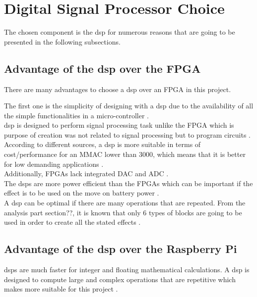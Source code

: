 \section{Digital Signal Processor Choice}

The chosen component is the \gls{dsp} for numerous reasons that are going to be presented in the following subsections.

\subsection{Advantage of the \gls{dsp} over the FPGA}

There are many advantages to choose a \gls{dsp} over an FPGA in this project. 

The first one is the simplicity of designing with a \gls{dsp} due to the availability of all the simple functionalities in a micro-controller \citep{eetimes}. \\

\gls{dsp} is designed to perform signal processing task unlike the FPGA which is purpose of creation was not related to signal processing but to program circuits \citep{eetimes}. \\

According to different sources, a \gls{dsp} is more suitable in terms of cost/performance for an MMAC lower than 3000, which means that it is better for low demanding applications \citep{eetimes}. \\

Additionally, FPGAs lack integrated DAC and ADC \citep{eetimes}. \\

The \gls{dsp}s are more power efficient than the FPGAs which can be important if the effect is to be used on the move on battery power \citep{rtcmag}. \\

A \gls{dsp} can be optimal if there are many operations that are repeated. From the analysis part section??, it is known that only 6 types of blocks are going to be used in order to create all the stated effects \citep{eetimes} \citep{hunteng}. \\

\subsection{Advantage of the \gls{dsp} over the Raspberry Pi}

\gls{dsp}s are much faster for integer and floating mathematical calculations. A \gls{dsp} is designed to compute large and complex operations that are repetitive which makes more suitable for this project \citep{diffbet} \citep{esp_simone}.   \\

